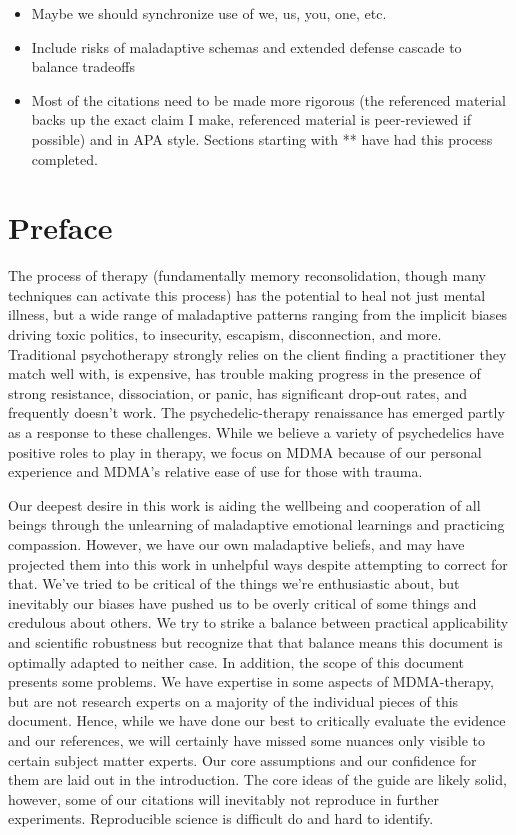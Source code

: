 \documentclass[12pt,letterpaper]{article}
\begin{document}
\begin{itemize}
    \item Maybe we should synchronize use of we, us, you, one, etc.
    \item Include risks of maladaptive schemas and extended defense cascade to balance tradeoffs
    \item Most of the citations need to be made more rigorous (the referenced material backs up the exact claim I make, referenced material is peer-reviewed if possible) and in APA style. Sections starting with ** have had this process completed.
\end{itemize}
\section*{Preface}


The process of therapy (fundamentally memory reconsolidation, though many techniques can activate this process) has the potential to heal not just mental illness, but a wide range of maladaptive patterns ranging from the implicit biases driving toxic politics, to insecurity, escapism, disconnection, and more. Traditional psychotherapy strongly relies on the client finding a practitioner they match well with, is expensive, has trouble making progress in the presence of strong resistance, dissociation, or panic, has significant drop-out rates, and frequently doesn't work. The psychedelic-therapy renaissance has emerged partly as a response to these challenges. While we believe a variety of psychedelics have positive roles to play in therapy, we focus on MDMA because of our personal experience and MDMA's relative ease of use for those with trauma.

Our deepest desire in this work is aiding the wellbeing and cooperation of all beings through the unlearning of maladaptive emotional learnings and practicing compassion. However, we have our own maladaptive beliefs, and may have projected them into this work in unhelpful ways despite attempting to correct for that. We’ve tried to be critical of the things we’re enthusiastic about, but inevitably our biases have pushed us to be overly critical of some things and credulous about others. We try to strike a balance between practical applicability and scientific robustness but recognize that that balance means this document is optimally adapted to neither case. In addition, the scope of this document presents some problems. We have expertise in some aspects of MDMA-therapy, but are not research experts on a majority of the individual pieces of this document. Hence, while we have done our best to critically evaluate the evidence and our references, we will certainly have missed some nuances only visible to certain subject matter experts. Our core assumptions and our confidence for them are laid out in the introduction. The core ideas of the guide are likely solid, however, some of our citations will inevitably not reproduce in further experiments. Reproducible science is difficult do and hard to identify.
\end{document}
